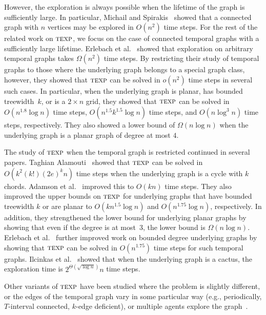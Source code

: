 \documentclass[10pt,a4paper]{article}
\newcommand{\texp}{\textsc{texp}}
\begin{document}
However, the exploration is always possible when the lifetime of the graph is
sufficiently large. In particular, Michail and Spirakis~\cite{MichailS16} showed
that a connected graph with $n$ vertices may be explored in $O(n^2)$ time steps. For
the rest of the related work on $\texp$, we focus on the case of connected
temporal graphs with a sufficiently large lifetime. Erlebach et
al.~\cite{ErlebachHK21} showed that exploration on arbitrary temporal graphs
takes $\Omega(n^2)$ time steps. By restricting their study of temporal
graphs to those where the underlying graph belongs to a special graph class,
however, they showed that $\texp$ can be solved in $o(n^2)$ time steps in
several such cases. In particular,
when the underlying graph is planar, has bounded treewidth~$k$, or is a $2
\times n$ grid, they showed that $\texp$ can be solved in $O(n^{1.8} \log n)$
time steps, $O(n^{1.5} k^{1.5} \log n)$ time steps, and $O(n \log^3 n)$ time
steps, respectively. They also showed a lower bound of $\Omega(n \log n)$ when
the underlying graph is a planar graph of degree at most $4$. 

The study of $\texp$ when the temporal graph is restricted continued in
several papers. Taghian Alamouti~\cite{Taghian20} showed that $\texp$ can be
solved in $O(k^2 (k!) (2e)^k n)$ time steps when the underlying graph is a cycle
with $k$ chords. Adamson et al.~\cite{AdamsonGMZ22} improved this to $O(kn)$
time steps. They also improved the upper bounds on $\texp$ for underlying graphs
that have bounded treewidth $k$ or are planar to $O(k n^{1.5} \log n)$ and
$O(n^{1.75} \log n)$, respectively. In addition, they strengthened the lower bound for
underlying planar graphs by showing that even if the degree is at most~$3$, the
lower bound is $\Omega(n \log n)$. Erlebach et al.~\cite{ErlebachKLSS19} further
improved work on bounded degree underlying graphs by showing that  $\texp$ can
be solved in $O(n^{1.75})$ time steps for such temporal graphs.
Ilcinkas et al.~\cite{IlcinkasKW14}
showed that when the underlying graph is a cactus, the exploration time is
$2^{\Theta(\sqrt{\log n})} n$ time steps. 

Other variants of $\texp$ have been studied where the problem is slightly
different, or the edges of the temporal graph vary in some particular way (e.g.,
periodically, $T$-interval connected, $k$-edge deficient), or multiple agents
explore the
graph~\cite{AaronKM14a,AaronKM14b,AkridaMSR21,BumpusM23,ErlebachS22a,ErlebachS22b,IlcinkasW13}. 
\end{document}
